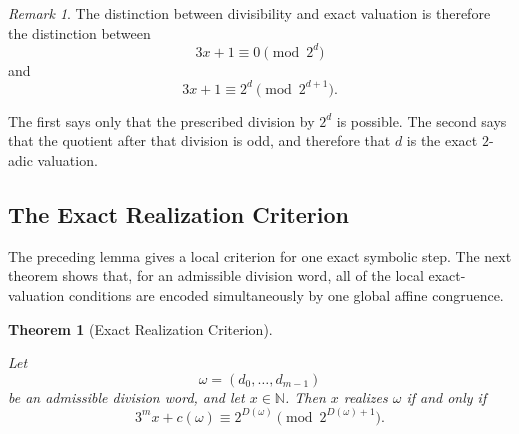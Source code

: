 \documentclass[12pt, oneside]{article}
\numberwithin{equation}{section}
\theoremstyle{definition}
\theoremstyle{plain}
\newtheorem{theorem}{Theorem}[section]
\theoremstyle{remark}
\newtheorem*{remark}{Remark}
\begin{document}
\begin{remark}
The distinction between divisibility and exact valuation is therefore the
distinction between
\[
3x+1\equiv0\pmod{2^d}
\]
and
\[
3x+1\equiv2^d\pmod{2^{d+1}}.
\]

The first says only that the prescribed division by \(2^d\) is possible.
The second says that the quotient after that division is odd, and therefore
that \(d\) is the exact \(2\)-adic valuation.
\end{remark}


\subsection{The Exact Realization Criterion}

The preceding lemma gives a local criterion for one exact symbolic step.
The next theorem shows that, for an admissible division word, all of the
local exact-valuation conditions are encoded simultaneously by one global
affine congruence.

\begin{theorem}[Exact Realization Criterion]
\label{thm:exact-realization-criterion}

Let
\[
\omega=(d_0,\dots,d_{m-1})
\]
be an admissible division word, and let \(x\in\mathbb N\). Then \(x\)
realizes \(\omega\) if and only if
\[
3^m x+c(\omega)
\equiv
2^{D(\omega)}
\pmod{2^{D(\omega)+1}}.
\]
\end{theorem}
\end{document}
